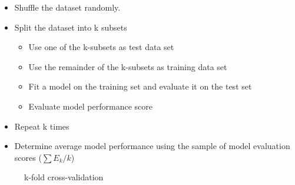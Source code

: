 \documentclass[aspectratio=43, notes]{beamer}
\begin{document}
%
%
%

\begin{frame}
\begin{itemize}[label=$\bullet$]
	\item Shuffle the dataset randomly.
	\item Split the dataset into k subsets
	\begin{itemize}[label=$\bullet$]
		\item Use one of the k-subsets as test data set
		\item Use the remainder of the k-subsets as training data set
		\item Fit a model on the training set and evaluate it on the test set
		\item Evaluate model performance score
	\end{itemize}
    \item Repeat k times
	\item Determine average model performance using the sample of model evaluation scores ($\sum E_k/k$)
\end{itemize}
\end{frame}



\begin{frame}
\begin{figure}
\caption{k-fold cross-validation}
\label{fig:kfolds}
\end{figure}
\end{frame}
\end{document}
